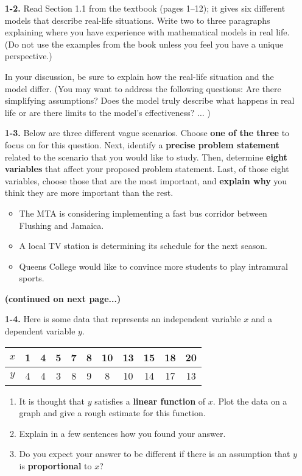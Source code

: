 \documentclass[12pt]{article}
\begin{document}
\begin{enumerate}
\item[\bf 1-2.]  Read Section 1.1 from the textbook (pages 1--12); it gives six different models that describe real-life situations. Write two to three paragraphs explaining where you have experience with mathematical models in real life. (Do not use the examples from the book unless you feel you have a unique perspective.)  

In your discussion, be sure to explain how the real-life situation and the model differ. (You may want to address the following questions: Are there simplifying assumptions? Does the model truly describe what happens in real life or are there limits to the model's effectiveness? $\ldots$ )
\item[\bf 1-3.]  Below are three different vague scenarios. Choose {\bf one of the three} to focus on for this question.   Next, identify a {\bf precise problem statement} related to the scenario that you would like to study. Then, determine {\bf eight variables} that affect your proposed problem statement. Last, of those eight variables, choose those that are the most important, and {\bf explain why} you think they are more important than the rest.
\begin{itemize}
\item The MTA is considering implementing a fast bus corridor between Flushing and Jamaica.
\item A local TV station is determining its schedule for the next season.
\item Queens College would like to convince more students to play intramural sports.
\end{itemize}
\begin{center}
\bf (continued on next page...)
\end{center}
\newpage
\item[\bf 1-4.]  Here is some data that represents an independent variable $x$ and a dependent variable $y$.\!\!\!\!\!\!\!\!

\begin{center}
\begin{tabular}{|c|cccccccccc|}\hline
$x$ & 1 & 4 & 5 & 7 & 8 & 10 & 13 & 15 & 18 & 20 \\ \hline
$y$ & 4 & 4 & 3 & 8 & 9 & 8 & 10 & 14 & 17 & 13 \\ \hline
\end{tabular}
\end{center}
\begin{enumerate}
\item It is thought that $y$ satisfies a {\bf linear function} of $x$. Plot the data on a graph and give a rough estimate for this function. 
\item Explain in a few sentences how you found your answer.  
\item Do you expect your answer to be different if there is an assumption that $y$ is {\bf proportional} to $x$?
\end{enumerate}
\end{enumerate}
\end{document}
